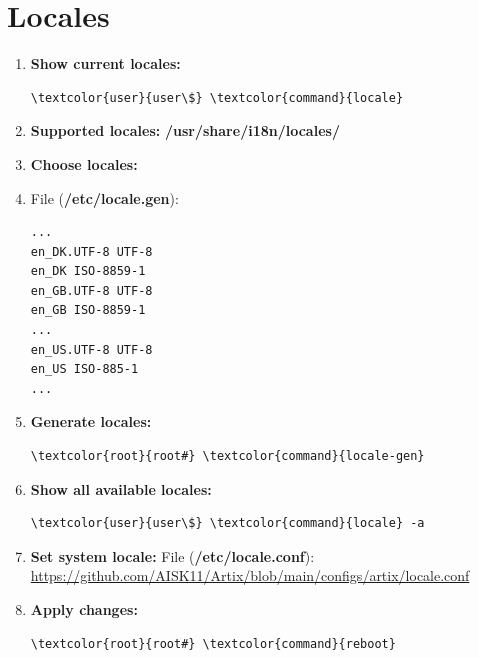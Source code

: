 \documentclass[10pt, a4paper, onecolumn, oneside, titlepage, openany]{book}
\begin{document}
\section{Locales}
\begin{enumerate}
    \item \textbf{Show current locales:}
\begin{Verbatim}[commandchars=\\\{\}]
\textcolor{user}{user\$} \textcolor{command}{locale}
\end{Verbatim}
    \item \textbf{Supported locales:}
\newline \textbf{\textcolor{dir}{/usr/share/i18n/locales/}}
    \item \textbf{Choose locales:}
\item File (\textbf{\textcolor{file}{/etc/locale.gen}}):
\begin{Verbatim}[commandchars=\\\{\}]
...
en_DK.UTF-8 UTF-8
en_DK ISO-8859-1
en_GB.UTF-8 UTF-8
en_GB ISO-8859-1
...
en_US.UTF-8 UTF-8
en_US ISO-885-1
...
\end{Verbatim}
    \item \textbf{Generate locales:}
\begin{Verbatim}[commandchars=\\\{\}]
\textcolor{root}{root#} \textcolor{command}{locale-gen}
\end{Verbatim}
    \item \textbf{Show all available locales:}
\begin{Verbatim}[commandchars=\\\{\}]
\textcolor{user}{user\$} \textcolor{command}{locale} -a
\end{Verbatim}
    \item \textbf{Set system locale:}
\newline File (\textbf{\textcolor{file}{/etc/locale.conf}}):
\newline \url{https://github.com/AISK11/Artix/blob/main/configs/artix/locale.conf}
    \item \textbf{Apply changes:}
\begin{Verbatim}[commandchars=\\\{\}]
\textcolor{root}{root#} \textcolor{command}{reboot}
\end{Verbatim}
\end{enumerate}
\end{document}
